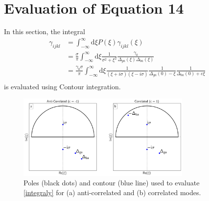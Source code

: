 \documentclass[aip, jcp, reprint, onecolumn, nofootinbib]{revtex4-2}
\begin{document}
\section{Evaluation of Equation 14}
In this section, the integral
\begin{equation}
	\begin{split}
		\gamma_{ijkl} &= \int_{-\infty}^\infty \mathrm{d}\xi P(\xi) \gamma_{ijkl}(\xi)\\
		&=\frac{\sigma}{\pi}\int_{-\infty}^\infty \mathrm{d}\xi \frac{1}{\sigma^2 + \xi^2} \frac{\gamma_0}{\Delta_{ga}(\xi)\Delta_{ba}(\xi)} \\
		&= \frac{\gamma_0 \sigma}{\pi} \int_{-\infty}^\infty \mathrm{d}\xi\frac{1}{(\xi + i\sigma)(\xi - i\sigma)} \frac{1}{\Delta_{ga}(0) - \xi} \frac{1}{\Delta_{ba}(0) + c\xi}\\
	\end{split}
\end{equation}
is evaluated using Contour integration.
\begin{figure}[!htbp]
	\centering
	\includegraphics[width=3.375in]{figures/corr_contour.png}
	\caption{Poles (black dots) and contour (blue line) used to evaluate \autoref{integraly} for (a) anti-correlated and (b) correlated modes.} 
	\label{fig:contours}
\end{figure}
\end{document}
